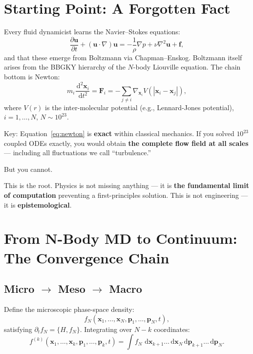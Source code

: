 \documentclass[11pt,a4paper]{article}
\theoremstyle{definition}
\theoremstyle{remark}
\newcommand{\abs}[1]{\left\lvert#1\right\rvert}
\newcommand{\dd}{\,\mathrm{d}}
\begin{document}
\section{Starting Point: A Forgotten Fact}

Every fluid dynamicist learns the Navier--Stokes equations:
\begin{equation}\label{eq:ns}
  \frac{\partial \bm{u}}{\partial t} + (\bm{u}\cdot\nabla)\bm{u}
  = -\frac{1}{\rho}\nabla p + \nu \nabla^2 \bm{u} + \bm{f},
\end{equation}
and that these emerge from Boltzmann via Chapman--Enskog. Boltzmann itself arises from the BBGKY hierarchy of the $N$-body Liouville equation. The chain bottom is Newton:
\begin{equation}\label{eq:newton}
  m_i \frac{\dd^2 \bm{x}_i}{\dd t^2} = \bm{F}_i
  = -\sum_{j\neq i} \nabla_{\bm{x}_i} V(\abs{\bm{x}_i - \bm{x}_j}),
\end{equation}
where $V(r)$ is the inter-molecular potential (e.g., Lennard-Jones potential), $i=1,\dots,N$, $N\sim 10^{23}$.

Key: Equation~\eqref{eq:newton} is \textbf{exact} within classical mechanics. If you solved $10^{23}$ coupled ODEs exactly, you would obtain \textbf{the complete flow field at all scales} --- including all fluctuations we call ``turbulence.''

But you cannot.

This is the root. Physics is not missing anything --- it is \textbf{the fundamental limit of computation} preventing a first-principles solution. This is not engineering --- it is \textbf{epistemological}.

\section{From N-Body MD to Continuum: The Convergence Chain}

\subsection{Micro $\to$ Meso $\to$ Macro}

Define the microscopic phase-space density:
\begin{equation}\label{eq:liouville}
  f_N(\bm{x}_1,\dots,\bm{x}_N,\bm{p}_1,\dots,\bm{p}_N,t),
\end{equation}
satisfying $\partial_t f_N = \{H, f_N\}$. Integrating over $N-k$ coordinates:
\begin{equation}\label{eq:bggky}
  f^{(k)}(\bm{x}_1,\dots,\bm{x}_k,\bm{p}_1,\dots,\bm{p}_k,t)
  = \int f_N \,\dd\bm{x}_{k+1}\dots\dd\bm{x}_N\dd\bm{p}_{k+1}\dots\dd\bm{p}_N.
\end{equation}
\end{document}
